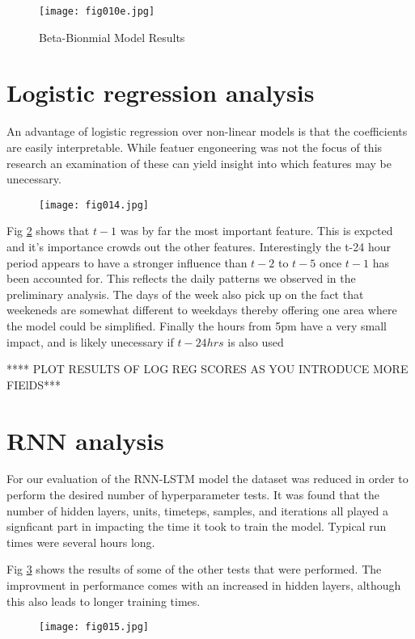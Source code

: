 \begin{figure}[h!]
	\centering
	\texttt{[image: fig010e.jpg]}
	\caption{Beta-Bionmial Model Results}
	\label{fig10e}
\end{figure} 

\section{Logistic regression analysis}

An advantage of logistic regression over non-linear models is that the coefficients are easily interpretable. While featuer engoneering was not the focus of this research an examination of these can yield insight into which features may be unecessary. 

\begin{figure}[h!]
	\centering
	\texttt{[image: fig014.jpg]}
	\caption{}
	\label{fig14}
\end{figure} 

Fig \ref{fig14} shows that $t-1$ was by far the most important feature. This is expcted and it's importance crowds out the other features. Interestingly the t-24 hour period appears to have a stronger influence than $t-2$ to $t-5$ once $t-1$ has been accounted for. This reflects the daily patterns we observed in the preliminary analysis. The days of the week also pick up on the fact that weekeneds are somewhat different to weekdays thereby offering one area where the model could be simplified. Finally the hours from 5pm have a very small impact, and is likely unecessary if $t-24hrs$ is also used

**** PLOT RESULTS OF LOG REG SCORES AS YOU INTRODUCE MORE FIElDS***

\section{RNN analysis}

For our evaluation of the RNN-LSTM model the dataset was reduced in order to perform the desired number of hyperparameter tests. It was found that the number of hidden layers, units, timeteps, samples, and iterations all played a signficant part in impacting the time it took to train the model. Typical run times were several hours long. 

Fig \ref{fig15} shows the results of some of the other tests that were performed. The improvment in performance comes with an increased in hidden layers, although this also leads to longer training times.

\begin{figure}[h!]
	\centering
	\texttt{[image: fig015.jpg]}
	\caption{}
	\label{fig15}
\end{figure}
